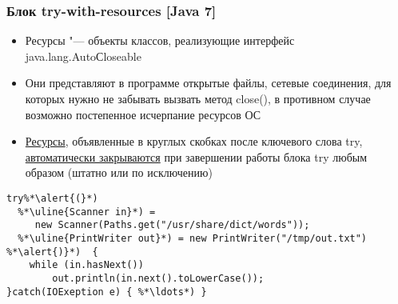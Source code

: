 \documentclass[xcolor=dvipsnames]{beamer}
\begin{document}
\begin{frame}[fragile]
\frametitle{Блок try-with-resources [Java 7]}
    \begin{itemize}
    \item Ресурсы "--- объекты классов, реализующие интерфейс java.lang.AutoСloseable
    
    \item Они представляют в программе открытые файлы, сетевые соединения, для которых нужно не забывать вызвать метод close(), в противном случае возможно постепенное исчерпание ресурсов ОС
    
    \item \uline{Ресурсы}, объявленные в \alert{круглых скобках} после ключевого слова try, \uline{автоматически закрываются} при завершении работы блока  try любым образом (штатно или по исключению)
\end{itemize}

\begin{lstlisting}
try%*\alert{(}*)
  %*\uline{Scanner in}*) =
     new Scanner(Paths.get("/usr/share/dict/words"));
  %*\uline{PrintWriter out}*) = new PrintWriter("/tmp/out.txt")
%*\alert{)}*)  {
    while (in.hasNext())
        out.println(in.next().toLowerCase());
}catch(IOExeption e) { %*\ldots*) }
\end{lstlisting}
\end{frame}
\end{document}
